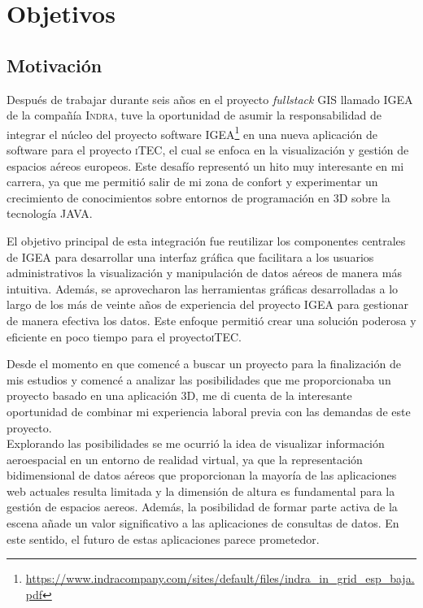 \documentclass[a4paper, 11pt]{book}
\begin{document}
\chapter{Objetivos}
\label{chap:objetivos}

\section{Motivación}
\label{sec:motivación}

Después de trabajar durante seis años en el proyecto \emph{fullstack} \textsc{GIS} llamado \textsc{IGEA} de la compañía \textsc{Indra}, tuve la oportunidad de asumir la responsabilidad de integrar el núcleo del proyecto software \textsc{IGEA}\footnote{\url{https://www.indracompany.com/sites/default/files/indra_in_grid_esp_baja.pdf}} en una nueva aplicación de software para el proyecto \textsc{iTEC}, el cual se enfoca en la visualización y gestión de espacios aéreos europeos. Este desafío representó un hito muy interesante en mi carrera, ya que me permitió salir de mi zona de confort y experimentar un crecimiento de conocimientos sobre entornos de programación en 3D sobre la tecnología \textsc{JAVA}.

El objetivo principal de esta integración fue reutilizar los componentes centrales de \textsc{IGEA} para desarrollar una interfaz gráfica que facilitara a los usuarios administrativos la visualización y manipulación de datos aéreos de manera más intuitiva. Además, se aprovecharon las herramientas gráficas desarrolladas a lo largo de los más de veinte años de experiencia del proyecto \textsc{IGEA} para gestionar de manera efectiva los datos. Este enfoque permitió crear una solución poderosa y eficiente en poco tiempo para el proyecto\textsc{iTEC}.

Desde el momento en que comencé a buscar un proyecto para la finalización de mis estudios y comencé a analizar las posibilidades que me proporcionaba un proyecto basado en una aplicación \textsc{3D}, me di cuenta de la interesante oportunidad de combinar mi experiencia laboral previa con las demandas de este proyecto. \\
Explorando las posibilidades se me ocurrió la idea de visualizar información aeroespacial en un entorno de realidad virtual, ya que la representación bidimensional de datos aéreos que proporcionan la mayoría de las aplicaciones web actuales resulta limitada y la dimensión de altura es fundamental para la gestión de espacios aereos. Además, la posibilidad de formar parte activa de la escena añade un valor significativo a las aplicaciones de consultas de datos. En este sentido, el futuro de estas aplicaciones parece prometedor.
\end{document}
